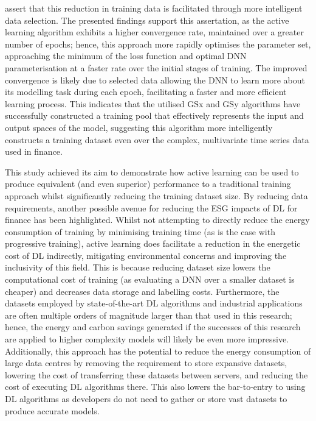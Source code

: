 \documentclass[a4paper, 11pt]{report}
\begin{document}
    \citet{ren-2021} assert that this reduction in training data is facilitated through more intelligent data selection. The presented findings support this assertation, as the active learning algorithm exhibits a higher convergence rate, maintained over a greater number of epochs; hence, this approach more rapidly optimises the parameter set, approaching the minimum of the loss function and optimal DNN parameterisation at a faster rate over the initial stages of training. The improved convergence is likely due to selected data allowing the DNN to learn more about its modelling task during each epoch, facilitating a faster and more efficient learning process. This indicates that the utilised GSx and GSy algorithms have successfully constructed a training pool that effectively represents the input and output spaces of the model, suggesting this algorithm more intelligently constructs a training dataset even over the complex, multivariate time series data used in finance.

    This study achieved its aim to demonstrate how active learning can be used to produce equivalent (and even superior) performance to a traditional training approach whilst significantly reducing the training dataset size. By reducing data requirements, another possible avenue for reducing the ESG impacts of DL for finance has been highlighted. Whilst not attempting to directly reduce the energy consumption of training by minimising training time (as is the case with progressive training), active learning does facilitate a reduction in the energetic cost of DL indirectly, mitigating environmental concerns and improving the inclusivity of this field. This is because reducing dataset size lowers the computational cost of training (as evaluating a DNN over a smaller dataset is cheaper) and decreases data storage and labelling costs. Furthermore, the datasets employed by state-of-the-art DL algorithms and industrial applications are often multiple orders of magnitude larger than that used in this research; hence, the energy and carbon savings generated if the successes of this research are applied to higher complexity models will likely be even more impressive. Additionally, this approach has the potential to reduce the energy consumption of large data centres by removing the requirement to store expansive datasets, lowering the cost of transferring these datasets between servers, and reducing the cost of executing DL algorithms there. This also lowers the bar-to-entry to using DL algorithms as developers do not need to gather or store vast datasets to produce accurate models. 
    
\end{document}
